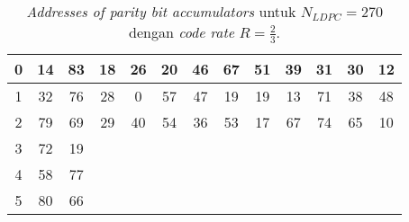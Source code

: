 \begin{table}[tb]
	\centering
	\caption{\textit{Addresses of parity bit accumulators} untuk $N_{LDPC}=270$ dengan \textit{code rate} $R=\frac{2}{3}$.}
	\label{table:rate2}
	\begin{tabular}{ccccccccccccc}
		\hline
		\multicolumn{1}{|c|}{0}  & \multicolumn{1}{c|}{14} & \multicolumn{1}{c|}{83} & \multicolumn{1}{c|}{18} & \multicolumn{1}{c|}{26} & \multicolumn{1}{c|}{20} & \multicolumn{1}{c|}{46} & \multicolumn{1}{c|}{67} & \multicolumn{1}{c|}{51} & \multicolumn{1}{c|}{39} & \multicolumn{1}{c|}{31} & \multicolumn{1}{c|}{30} & \multicolumn{1}{c|}{12} \\ \hline
		\multicolumn{1}{|c|}{1}  & \multicolumn{1}{c|}{32} & \multicolumn{1}{c|}{76} & \multicolumn{1}{c|}{28} & \multicolumn{1}{c|}{0}  & \multicolumn{1}{c|}{57} & \multicolumn{1}{c|}{47} & \multicolumn{1}{c|}{19} & \multicolumn{1}{c|}{19} & \multicolumn{1}{c|}{13} & \multicolumn{1}{c|}{71} & \multicolumn{1}{c|}{38} & \multicolumn{1}{c|}{48} \\ \hline
		\multicolumn{1}{|c|}{2}  & \multicolumn{1}{c|}{79} & \multicolumn{1}{c|}{69} & \multicolumn{1}{c|}{29} & \multicolumn{1}{c|}{40} & \multicolumn{1}{c|}{54} & \multicolumn{1}{c|}{36} & \multicolumn{1}{c|}{53} & \multicolumn{1}{c|}{17} & \multicolumn{1}{c|}{67} & \multicolumn{1}{c|}{74} & \multicolumn{1}{c|}{65} & \multicolumn{1}{c|}{10} \\ \hline
		\multicolumn{1}{|c|}{3}  & \multicolumn{1}{c|}{72} & \multicolumn{1}{c|}{19} &                         &                         &                         &                         &                         &                         &                         &                         &                         &                         \\ \cline{1-3}
		\multicolumn{1}{|c|}{4}  & \multicolumn{1}{c|}{58} & \multicolumn{1}{c|}{77} &                         &                         &                         &                         &                         &                         &                         &                         &                         &                         \\ \cline{1-3}
		\multicolumn{1}{|c|}{5}  & \multicolumn{1}{c|}{80} & \multicolumn{1}{c|}{66} &                         &                         &                         &                         &                         &                         &                         &                         &                         &                         \\ \cline{1-3}

\end{tabular}
\end{table}
